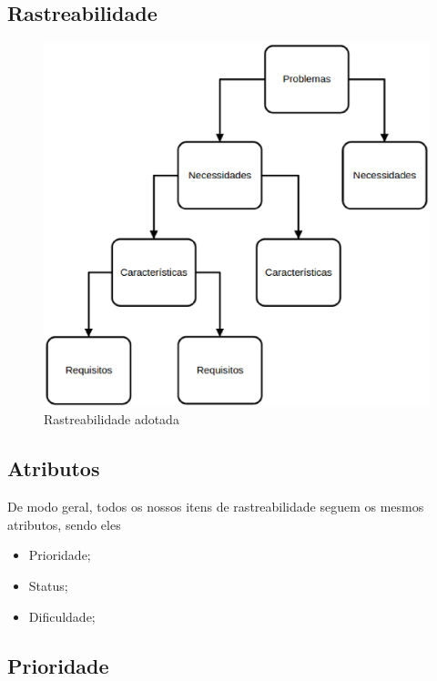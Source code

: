 \clearpage{}

\subsection {Rastreabilidade}

\begin{figure}[htb]
	\centering
	\label{rastreabilidade2}
		\includegraphics[keepaspectratio=true,scale=0.6]{figuras/rastreabilidade2.eps}
	\caption{Rastreabilidade adotada}
\end{figure}

\clearpage{}

\subsection {Atributos}

De modo geral, todos os nossos itens de rastreabilidade seguem os mesmos atributos, sendo eles

\begin{itemize}

\item{Prioridade;}
\item{Status;}
\item{Dificuldade;}

\end{itemize}

\subsection{Prioridade}

